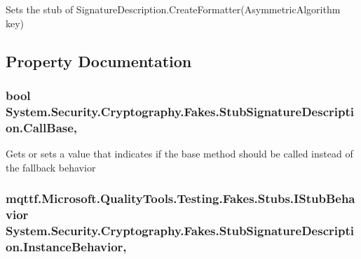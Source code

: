 Sets the stub of Signature\-Description.\-Create\-Formatter(\-Asymmetric\-Algorithm key)



\subsection{Property Documentation}
\hypertarget{class_system_1_1_security_1_1_cryptography_1_1_fakes_1_1_stub_signature_description_a2d8d0c5fc2e1643d0f3d2b6c7241cb5a}{
\subsubsection[{Call\-Base}]{\setlength{\rightskip}{0pt plus 5cm}bool System.\-Security.\-Cryptography.\-Fakes.\-Stub\-Signature\-Description.\-Call\-Base\hspace{0.3cm}{\ttfamily [get]}, {\ttfamily [set]}}}\label{class_system_1_1_security_1_1_cryptography_1_1_fakes_1_1_stub_signature_description_a2d8d0c5fc2e1643d0f3d2b6c7241cb5a}


Gets or sets a value that indicates if the base method should be called instead of the fallback behavior

\hypertarget{class_system_1_1_security_1_1_cryptography_1_1_fakes_1_1_stub_signature_description_a54a3dffd8deb91f7bb4f4e870cea9209}{
\subsubsection[{Instance\-Behavior}]{\setlength{\rightskip}{0pt plus 5cm}mqttf.\-Microsoft.\-Quality\-Tools.\-Testing.\-Fakes.\-Stubs.\-I\-Stub\-Behavior System.\-Security.\-Cryptography.\-Fakes.\-Stub\-Signature\-Description.\-Instance\-Behavior\hspace{0.3cm}{\ttfamily [get]}, {\ttfamily [set]}}}\label{class_system_1_1_security_1_1_cryptography_1_1_fakes_1_1_stub_signature_description_a54a3dffd8deb91f7bb4f4e870cea9209}


